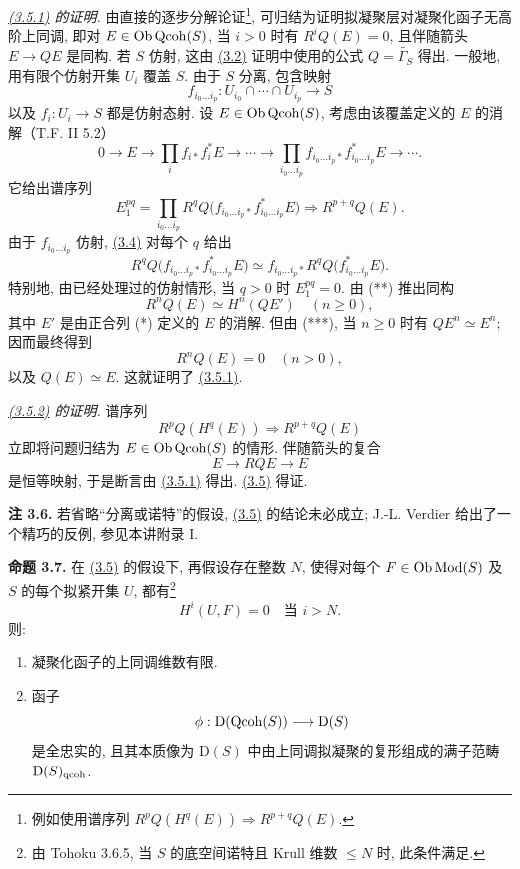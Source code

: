 \emph{\hyperlink{sga6.e02.prop.3-5}{(3.5.1)} 的证明.} 由直接的逐步分解论证\footnote{例如使用谱序列 $R^pQ(H^q(E))\Longrightarrow R^{p+q}Q(E)$.}, 可归结为证明拟凝聚层对凝聚化函子无高阶上同调, 即对 $E\in\operatorname{Ob}\operatorname{Qcoh}(S)$, 当 $i>0$ 时有 $R^iQ(E)=0$, 且伴随箭头 $E\to QE$ 是同构. 若 $S$ 仿射, 这由 \hyperlink{sga6.e02.lem.3-2}{(3.2)} 证明中使用的公式 $Q=\widetilde{\Gamma_S}$ 得出. 一般地, 用有限个仿射开集 $U_i$ 覆盖 $S$. 由于 $S$ 分离, 包含映射
\[
 f_{i_0\ldots i_p}:U_{i_0}\cap\cdots\cap U_{i_p}\longrightarrow S
\]
以及 $f_i:U_i\to S$ 都是仿射态射. 设 $E\in\operatorname{Ob}\operatorname{Qcoh}(S)$, 考虑由该覆盖定义的 $E$ 的消解（T.F. II 5.2）
\begin{equation}\tag{*}
 0\longrightarrow E\longrightarrow \prod_i f_{i*}f_i^*E\longrightarrow\cdots\longrightarrow
 \prod_{i_0\ldots i_p}f_{i_0\ldots i_p*}f_{i_0\ldots i_p}^*E\longrightarrow\cdots .
\end{equation}
它给出谱序列
\begin{equation}\tag{**}
 E_1^{pq}=\prod_{i_0\ldots i_p}R^qQ\bigl(f_{i_0\ldots i_p*}f_{i_0\ldots i_p}^*E\bigr)
 \Longrightarrow R^{p+q}Q(E).
\end{equation}
由于 $f_{i_0\ldots i_p}$ 仿射, \hyperlink{sga6.e02.lem.3-4}{(3.4)} 对每个 $q$ 给出
\begin{equation}\tag{***}
 R^qQ\bigl(f_{i_0\ldots i_p*}f_{i_0\ldots i_p}^*E\bigr)
 \simeq f_{i_0\ldots i_p*}R^qQ\bigl(f_{i_0\ldots i_p}^*E\bigr).
\end{equation}
特别地, 由已经处理过的仿射情形, 当 $q>0$ 时 $E_1^{pq}=0$. 由 (**) 推出同构
\[
 R^nQ(E)\simeq H^n(QE')\quad(n\geq0),
\]
其中 $E'$ 是由正合列 (*) 定义的 $E$ 的消解. 但由 (***), 当 $n\geq0$ 时有 $QE^n\simeq E^n$; 因而最终得到
\[
 R^nQ(E)=0\quad(n>0),
\]
以及 $Q(E)\simeq E$. 这就证明了 \hyperlink{sga6.e02.prop.3-5}{(3.5.1)}.

\emph{\hyperlink{sga6.e02.prop.3-5}{(3.5.2)} 的证明.} 谱序列
\[
 R^pQ(H^q(E))\Longrightarrow R^{p+q}Q(E)
\]
立即将问题归结为 $E\in\operatorname{Ob}\operatorname{Qcoh}(S)$ 的情形. 伴随箭头的复合
\[
 E\longrightarrow RQE\longrightarrow E
\]
是恒等映射, 于是断言由 \hyperlink{sga6.e02.prop.3-5}{(3.5.1)} 得出. \hyperlink{sga6.e02.prop.3-5}{(3.5)} 得证.

\textbf{注 3.6.} 若省略“分离或诺特”的假设, \hyperlink{sga6.e02.prop.3-5}{(3.5)} 的结论未必成立; J.-L. Verdier 给出了一个精巧的反例, 参见本讲附录 I.

\textbf{命题 3.7.} 在 \hyperlink{sga6.e02.prop.3-5}{(3.5)} 的假设下, 再假设存在整数 $N$, 使得对每个 $F\in\operatorname{Ob}\operatorname{Mod}(S)$ 及 $S$ 的每个拟紧开集 $U$, 都有\footnote{由 Tohoku 3.6.5, 当 $S$ 的底空间诺特且 Krull 维数 $\leq N$ 时, 此条件满足.}
\[
 H^i(U,F)=0\quad\text{当 }i>N.
\]
则:
\begin{enumerate}[label=\alph*)]
\item 凝聚化函子的上同调维数有限.
\item 函子
\[
 \phi:\mathrm D(\operatorname{Qcoh}(S))\longrightarrow \mathrm D(S)
\]
是全忠实的, 且其本质像为 $\mathrm D(S)$ 中由上同调拟凝聚的复形组成的满子范畴 $\mathrm D(S)_{\mathrm{qcoh}}$.
\end{enumerate}

